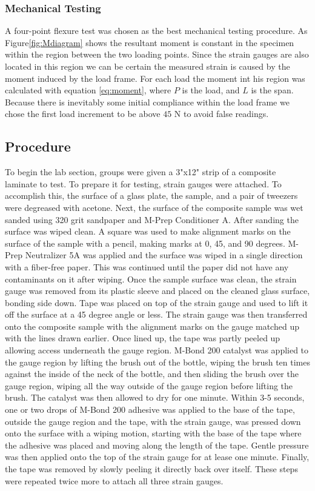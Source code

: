 \documentclass[12pt]{article}
\begin{document}
\subsubsection*{Mechanical Testing}
A four-point flexure test was chosen as  the best mechanical testing procedure.   As Figure\ref{fig:Mdiagram}  shows the resultant moment is constant in the specimen within the region between the two loading points.  Since the strain gauges are also located in this region we can be certain the measured strain is caused by the moment induced by the load frame. For each load the moment int his region  was calculated with equation \ref{eq:moment}, where $P$ is the load, and $L$ is the span.  Because there is inevitably some initial compliance within the load frame  we chose the first load increment to be above $45$ N to avoid false readings.  

\subsection{Procedure} %

To begin the lab section, groups were given a 3"x12" strip of a composite laminate to test. To prepare it for testing, strain gauges were attached. To accomplish this, the surface of a glass plate, the sample, and a pair of tweezers were degreased with acetone. Next, the surface of the composite sample was wet sanded using 320 grit sandpaper and M-Prep Conditioner A. After sanding the surface was wiped clean. A square was used to make alignment marks on the surface of the sample with a pencil, making marks at 0, 45, and 90 degrees. M-Prep Neutralizer 5A was applied and the surface was wiped in a single direction with a fiber-free paper. This was continued until the paper did not have any contaminants on it after wiping. Once the sample surface was clean, the strain gauge was removed from its plastic sleeve and placed on the cleaned glass surface, bonding side down. Tape was placed on top of the strain gauge and used to lift it off the surface at a 45 degree angle or less. The strain gauge was then transferred onto the composite sample with the alignment marks on the gauge matched up with the lines drawn earlier. Once lined up, the tape was partly peeled up allowing access underneath the gauge region. M-Bond 200 catalyst was applied to the gauge region by lifting the brush out of the bottle, wiping the brush ten times against the inside of the neck of the bottle, and then sliding the brush over the gauge region, wiping all the way outside of the gauge region before lifting the brush. The catalyst was then allowed to dry for one minute. Within 3-5 seconds, one or two drops of M-Bond 200 adhesive was applied to the base of the tape, outside the gauge region and the tape, with the strain gauge, was pressed down onto the surface with a wiping motion, starting with the base of the tape where the adhesive was placed and moving along the length of the tape. Gentle pressure was then applied onto the top of the strain gauge for at lease one minute. Finally, the tape was removed by slowly peeling it directly back over itself. These steps were repeated twice more to attach all three strain gauges.
\end{document}
